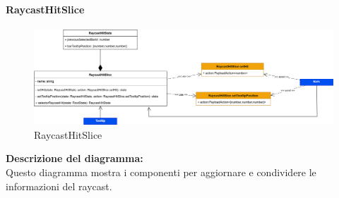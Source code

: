 \paragraph{RaycastHitSlice}
\begin{figure}[h!] \centering
      \includegraphics[scale=0.20]{template/images/uml_front/logic/RaycastHitSlice.png}
      \caption{RaycastHitSlice}
\end{figure}
\textbf{Descrizione del diagramma:}\\
Questo diagramma mostra i componenti per aggiornare e condividere le informazioni del raycast.
